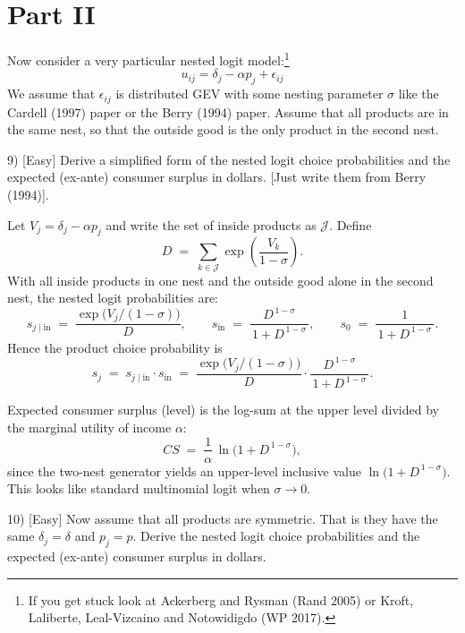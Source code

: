\documentclass{article}
\begin{document}
\section*{Part II}

\begin{tcolorbox}
Now consider a very particular nested logit model:\footnote{If you get stuck look at Ackerberg and Rysman (Rand 2005) or Kroft, Laliberte, Leal-Vizcaino and Notowidigdo (WP 2017).}
\[
u_{ij} = \delta_j - \alpha p_j + \epsilon_{ij}
\]
We assume that $\epsilon_{ij}$ is distributed GEV with some nesting parameter $\sigma$ like the Cardell (1997) paper or the Berry (1994) paper. Assume that all products are in the same nest, so that the outside good is the only product in the second nest.
\end{tcolorbox}

\begin{tcolorbox}
9) [Easy] Derive a simplified form of the nested logit choice probabilities and the expected (ex-ante) consumer surplus in dollars. [Just write them from Berry (1994)].
\end{tcolorbox}

Let $V_j=\delta_j-\alpha p_j$ and write the set of inside products as $\mathcal{J}$. Define
\[
D \;=\; \sum_{k \in \mathcal{J}} \exp\!\left(\frac{V_k}{1-\sigma}\right).
\]
With all inside products in one nest and the outside good alone in the second nest, the nested logit probabilities are:
\[
s_{j\mid \text{in}} \;=\; \frac{\exp\!\big(V_j/(1-\sigma)\big)}{D}, 
\qquad
s_{\text{in}} \;=\; \frac{D^{\,1-\sigma}}{\,1+D^{\,1-\sigma}\,}, 
\qquad
s_{0} \;=\; \frac{1}{\,1+D^{\,1-\sigma}\,}.
\]
Hence the product choice probability is
\[
s_j \;=\; s_{j\mid \text{in}}\cdot s_{\text{in}}
\;=\; 
\frac{\exp\!\big(V_j/(1-\sigma)\big)}{D}\cdot 
\frac{D^{\,1-\sigma}}{\,1+D^{\,1-\sigma}\,}.
\]


Expected consumer surplus (level) is the log-sum at the upper level divided by the
marginal utility of income $\alpha$:
\[
CS \;=\; \frac{1}{\alpha}\,\ln\!\big(1 + D^{\,1-\sigma}\big),
\]
since the two-nest generator yields an upper-level inclusive value $\ln\!\big(1 + D^{\,1-\sigma}\big)$. This looks like standard multinomial logit when $\sigma\to 0$.


\begin{tcolorbox}
10) [Easy] Now assume that all products are symmetric. That is they have the same $\delta_j = \delta$ and $p_j = p$. Derive the nested logit choice probabilities and the expected (ex-ante) consumer surplus in dollars.
\end{tcolorbox}
\end{document}
